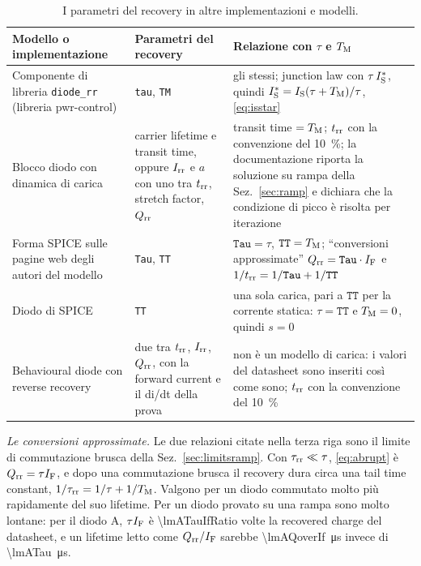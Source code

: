 \documentclass[10pt,a4paper]{scrartcl}
\let\newcommand\lmitdefine
\newcommand{\IF}{I_\mathrm{F}}
\newcommand{\Irr}{I_\mathrm{rr}}
\newcommand{\Qrr}{Q_\mathrm{rr}}
\newcommand{\trr}{t_\mathrm{rr}}
\newcommand{\taurr}{\tau_\mathrm{rr}}
\newcommand{\TM}{T_\mathrm{M}}
\newcommand{\IS}{I_\mathrm{S}}
\begin{document}
\begin{table}[htb]
\centering\small
\caption{I parametri del recovery in altre implementazioni e modelli.}
\label{tab:others}
\begin{tabular}{@{}p{4.6cm}p{4.2cm}p{7.2cm}@{}}
\toprule
Modello o implementazione & Parametri del recovery & Relazione con $\tau$ e $\TM$ \\
\midrule
Componente di libreria \texttt{diode\_rr} (libreria pwr-control) & \texttt{tau}, \texttt{TM} & gli stessi; junction law con $\tau\,\IS^{*}$, quindi $\IS^{*} = \IS(\tau+\TM)/\tau$, \eqref{eq:isstar} \\
\addlinespace
Blocco diodo con dinamica di carica \cite{mathworks} & carrier lifetime e transit time, oppure $\Irr$ e $a$ con uno tra $\trr$, stretch factor, $\Qrr$ & transit time $= \TM$; $\trr$ con la convenzione del \SI{10}{\percent}; la documentazione riporta la soluzione su rampa della Sez.~\ref{sec:ramp} e dichiara che la condizione di picco è risolta per iterazione \\
\addlinespace
Forma SPICE sulle pagine web degli autori del modello \cite{pemodels} & \texttt{Tau}, \texttt{TT} & $\texttt{Tau} = \tau$, $\texttt{TT} = \TM$; ``conversioni approssimate'' $\Qrr = \texttt{Tau}\cdot\IF$ e $1/\trr = 1/\texttt{Tau} + 1/\texttt{TT}$ \\
\addlinespace
Diodo di SPICE & \texttt{TT} & una sola carica, pari a $\texttt{TT}$ per la corrente statica: $\tau = \texttt{TT}$ e $\TM = 0$, quindi $s = 0$ \\
\addlinespace
Behavioural diode con reverse recovery \cite{plecs} & due tra $\trr$, $\Irr$, $\Qrr$, con la forward current e il di/dt della prova & non è un modello di carica: i valori del datasheet sono inseriti così come sono; $\trr$ con la convenzione del \SI{10}{\percent} \\
\bottomrule
\end{tabular}
\end{table}

\emph{Le conversioni approssimate.} Le due relazioni citate nella terza riga sono il limite di commutazione brusca della Sez.~\ref{sec:limitsramp}. Con $\taurr \ll \tau$, \eqref{eq:abrupt} è $\Qrr = \tau\IF$, e dopo una commutazione brusca il recovery dura circa una tail time constant, $1/\taurr = 1/\tau + 1/\TM$. Valgono per un diodo commutato molto più rapidamente del suo lifetime. Per un diodo provato su una rampa sono molto lontane: per il diodo A, $\tau\IF$ è \num{\lmATauIfRatio} volte la recovered charge del datasheet, e un lifetime letto come $\Qrr/\IF$ sarebbe \SI{\lmAQoverIf}{\micro\second} invece di \SI{\lmATau}{\micro\second}.
\end{document}
